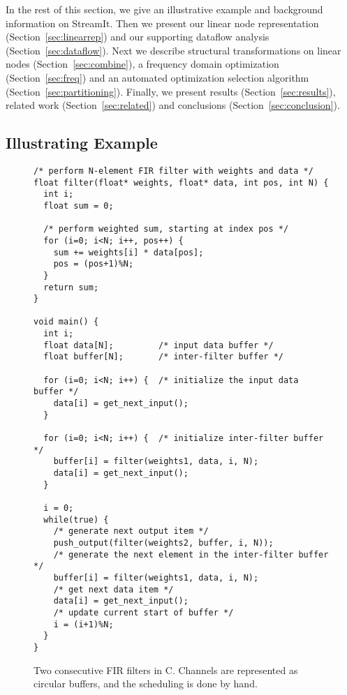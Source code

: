 In the rest of this section, we give an illustrative example and
background information on StreamIt.  Then we present our linear
node representation (Section~\ref{sec:linearrep}) and our 
supporting dataflow analysis (Section~\ref{sec:dataflow}).  
Next we describe structural transformations on linear nodes 
(Section~\ref{sec:combine}), a frequency domain optimization 
(Section~\ref{sec:freq}) and an automated optimization selection 
algorithm (Section~\ref{sec:partitioning}). Finally, we
present results (Section~\ref{sec:results}), related work
(Section~\ref{sec:related}) and conclusions
(Section~\ref{sec:conclusion}).

\subsection{Illustrating Example}
\begin{figure}[t]
\vspace{-6pt}
\center
\epsfxsize=3.0in
\vspace{-5pt}
\caption{Block diagram of two FIR filters.}
\label{fig:motivating-fig}
\scriptsize
\begin{verbatim}
/* perform N-element FIR filter with weights and data */
float filter(float* weights, float* data, int pos, int N) {
  int i;
  float sum = 0;

  /* perform weighted sum, starting at index pos */
  for (i=0; i<N; i++, pos++) {
    sum += weights[i] * data[pos];
    pos = (pos+1)%N;
  }
  return sum;
}

void main() {
  int i;
  float data[N];         /* input data buffer */
  float buffer[N];       /* inter-filter buffer */
  
  for (i=0; i<N; i++) {  /* initialize the input data buffer */
    data[i] = get_next_input();
  }
  
  for (i=0; i<N; i++) {  /* initialize inter-filter buffer */
    buffer[i] = filter(weights1, data, i, N);
    data[i] = get_next_input();
  }
  
  i = 0;
  while(true) {
    /* generate next output item */
    push_output(filter(weights2, buffer, i, N));
    /* generate the next element in the inter-filter buffer */
    buffer[i] = filter(weights1, data, i, N);
    /* get next data item */
    data[i] = get_next_input();
    /* update current start of buffer */
    i = (i+1)%N;
  }
}
\end{verbatim}
\vspace{-18pt}
\caption{Two consecutive FIR filters in C.  Channels are represented
as circular buffers, and the scheduling is done by hand.
\protect\label{fig:motivating-example}}
\vspace{-12pt}
\end{figure}

